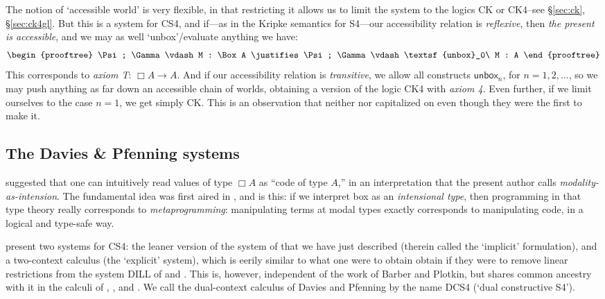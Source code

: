 \documentclass[a4paper]{amsart}
\begin{document}
The notion of `accessible world' is very flexible, in that restricting
it allows us to limit the system to the logics \textsf{CK} or
\textsf{CK4}--see \S \ref{sec:ck}, \S \ref{sec:ck4gl}. But this is
a system for \textsf{CS4}, and if---as in the Kripke semantics for
\textsf{S4}---our accessibility relation is \emph{reflexive}, then
\emph{the present is accessible}, and we may as well
`unbox'/evaluate anything we have: \[
  \begin{prooftree}
    \Psi; \Gamma \vdash M : \Box A
      \justifies
    \Psi; \Gamma \vdash \textsf{unbox}_0\ M : A
  \end{prooftree}
\] This corresponds to \emph{axiom T}: $\Box A \rightarrow A$. And
if our accessibility relation is \emph{transitive}, we allow all
constructs $\textsf{unbox}_n$, for $n = 1, 2, \dots$, so we may
push anything as far down an accessible chain of worlds, obtaining
a version of the logic \textsf{CK4} with \emph{axiom 4}. Even
further, if we limit ourselves to the case $n = 1$, we get simply
\textsf{CK}.  This is an observation that neither
\cite{Pfenning1995} nor \cite{Davies2001a} capitalized on even
though they were the first to make it.

\subsection{The Davies \& Pfenning systems}
\label{sec:dcs4}

\cite{Davies1996, Davies1999, Davies2001a} suggested that one can
intuitively read values of type $\Box A$ as ``code of type $A$,''
in an interpretation that the present author calls
\emph{modality-as-intension}. The fundamental idea was first aired
in \citep{Pfenning1995}, and is this: if we interpret box as an
\emph{intensional type}, then programming in that type theory
really corresponds to \emph{metaprogramming}: manipulating terms
at modal types exactly corresponds to manipulating code, in a
logical and type-safe way.

\cite{Davies2001a} present two systems for \textsf{CS4}: the
leaner version of the system of \cite{Pfenning1995} that we have
just described (therein called the `implicit' formulation), and a
two-context calculus (the `explicit' system), which is eerily
similar to what one were to obtain obtain if they were to remove
linear restrictions from the system \textsf{DILL} of
\cite{Barber1996} and \cite{Plotkin1993}. This is, however,
independent of the work of Barber and Plotkin, but shares common
ancestry with it in the calculi of \cite{Girard1993},
\cite{Andreoli1992}, and \cite{Wadler1993, Wadler1994}. We call
the dual-context calculus of Davies and Pfenning by the name
\textsf{DCS4} (`dual constructive \textsf{S4}').
\end{document}
